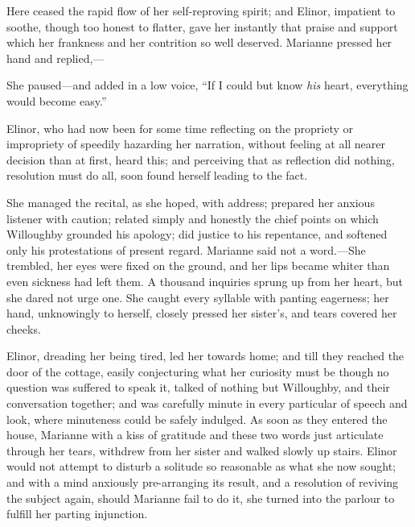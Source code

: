 Here ceased the rapid flow of her self-reproving spirit; and Elinor, impatient to soothe, though too honest to flatter, gave her instantly that praise and support which her frankness and her contrition so well deserved. Marianne pressed her hand and replied,---


She paused---and added in a low voice, “If I could but know {\em his} heart, everything would become easy.”

Elinor, who had now been for some time reflecting on the propriety or impropriety of speedily hazarding her narration, without feeling at all nearer decision than at first, heard this; and perceiving that as reflection did nothing, resolution must do all, soon found herself leading to the fact.

She managed the recital, as she hoped, with address; prepared her anxious listener with caution; related simply and honestly the chief points on which Willoughby grounded his apology; did justice to his repentance, and softened only his protestations of present regard. Marianne said not a word.---She trembled, her eyes were fixed on the ground, and her lips became whiter than even sickness had left them. A thousand inquiries sprung up from her heart, but she dared not urge one. She caught every syllable with panting eagerness; her hand, unknowingly to herself, closely pressed her sister's, and tears covered her cheeks.

Elinor, dreading her being tired, led her towards home; and till they reached the door of the cottage, easily conjecturing what her curiosity must be though no question was suffered to speak it, talked of nothing but Willoughby, and their conversation together; and was carefully minute in every particular of speech and look, where minuteness could be safely indulged. As soon as they entered the house, Marianne with a kiss of gratitude and these two words just articulate through her tears,  withdrew from her sister and walked slowly up stairs. Elinor would not attempt to disturb a solitude so reasonable as what she now sought; and with a mind anxiously pre-arranging its result, and a resolution of reviving the subject again, should Marianne fail to do it, she turned into the parlour to fulfill her parting injunction.

